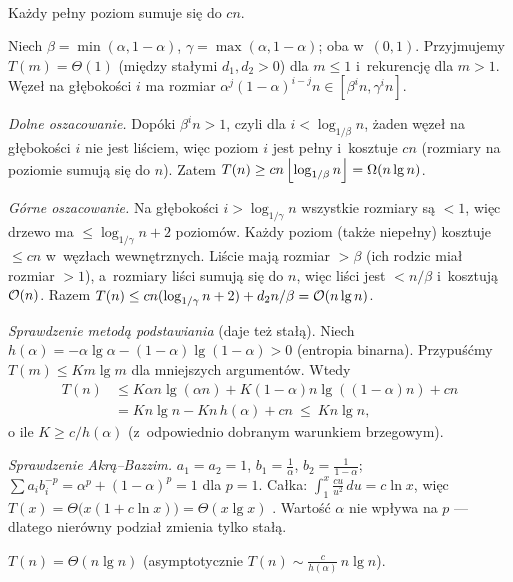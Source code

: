 \documentclass[11pt]{article}
\begin{document}
\begin{center}
\\
{\small Każdy pełny poziom sumuje się do $cn$.}
\end{center}

\formalnie
Niech $\beta=\min(\alpha,1-\alpha)$, $\gamma=\max(\alpha,1-\alpha)$; oba w~$(0,1)$.
Przyjmujemy $T(m)=\Theta(1)$ (między stałymi $d_1,d_2>0$) dla $m\le1$
i~rekurencję dla $m>1$. Węzeł na głębokości $i$ ma rozmiar
$\alpha^{j}(1-\alpha)^{i-j}n\in[\beta^in,\gamma^in]$.

\emph{Dolne oszacowanie.} Dopóki $\beta^in>1$, czyli dla $i<\log_{1/\beta}n$,
żaden węzeł na głębokości $i$ nie jest liściem, więc poziom $i$ jest pełny
i~kosztuje $cn$ (rozmiary na poziomie sumują się do $n$). Zatem
$T(n)\ge cn\left\lfloor \log_{1/\beta}n \right\rfloor=\Omega(n\operatorname{lg} n)$.

\emph{Górne oszacowanie.} Na głębokości $i>\log_{1/\gamma}n$ wszystkie
rozmiary są $<1$, więc drzewo ma $\le\log_{1/\gamma}n+2$ poziomów. Każdy poziom
(także niepełny) kosztuje $\le cn$ w~węzłach wewnętrznych. Liście mają
rozmiar $>\beta$ (ich rodzic miał rozmiar $>1$), a~rozmiary liści sumują się
do $n$, więc liści jest $<n/\beta$ i~kosztują $\mathcal{O}(n)$. Razem
$T(n)\le cn(\log_{1/\gamma}n+2)+d_2n/\beta=\mathcal{O}(n\operatorname{lg} n)$.

\emph{Sprawdzenie metodą podstawiania} (daje też stałą). Niech
$h(\alpha)=-\alpha\lg\alpha-(1-\alpha)\lg(1-\alpha)>0$ (entropia binarna).
Przypuśćmy $T(m)\le Km\lg m$ dla mniejszych argumentów. Wtedy
\begin{align*}
T(n)&\le K\alpha n\lg(\alpha n)+K(1-\alpha)n\lg((1-\alpha)n)+cn\\
&=Kn\lg n-Kn\,h(\alpha)+cn\ \le\ Kn\lg n,
\end{align*}
o ile $K\ge c/h(\alpha)$ (z~odpowiednio dobranym warunkiem brzegowym).

\emph{Sprawdzenie Akrą--Bazzim.} $a_1=a_2=1$, $b_1=\frac1\alpha$, $b_2=\frac1{1-\alpha}$;
$\sum a_ib_i^{-p}=\alpha^p+(1-\alpha)^p=1$ dla $p=1$. Całka: $\int_1^x\frac{cu}{u^2}\,du=c\ln x$, więc
$T(x)=\Theta\bigl(x(1+c\ln x)\bigr)=\Theta(x\lg x)$ \checkmark. Wartość $\alpha$ nie
wpływa na $p$ --- dlatego nierówny podział zmienia tylko stałą.
\begin{odpowiedz}$T(n)=\Theta(n\lg n)$ (asymptotycznie $T(n)\sim\frac{c}{h(\alpha)}\,n\lg n$).\end{odpowiedz}
\end{document}
